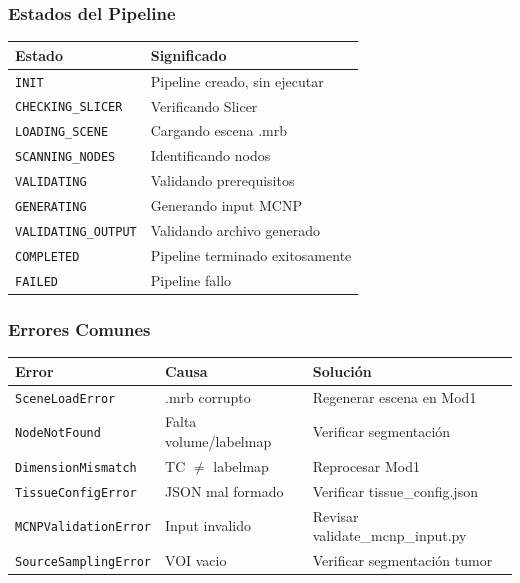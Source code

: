 \documentclass[12pt,a4paper]{article}
\begin{document}
\subsubsection{Estados del Pipeline}

\begin{center}
\begin{tabular}{ll}
\toprule
\textbf{Estado} & \textbf{Significado} \\
\midrule
\texttt{INIT} & Pipeline creado, sin ejecutar \\
\texttt{CHECKING\_SLICER} & Verificando Slicer \\
\texttt{LOADING\_SCENE} & Cargando escena .mrb \\
\texttt{SCANNING\_NODES} & Identificando nodos \\
\texttt{VALIDATING} & Validando prerequisitos \\
\texttt{GENERATING} & Generando input MCNP \\
\texttt{VALIDATING\_OUTPUT} & Validando archivo generado \\
\texttt{COMPLETED} & Pipeline terminado exitosamente \\
\texttt{FAILED} & Pipeline fallo \\
\bottomrule
\end{tabular}
\end{center}

\subsubsection{Errores Comunes}

\begin{center}
\begin{tabular}{lll}
\toprule
\textbf{Error} & \textbf{Causa} & \textbf{Solución} \\
\midrule
\texttt{SceneLoadError} & .mrb corrupto & Regenerar escena en Mod1 \\
\texttt{NodeNotFound} & Falta volume/labelmap & Verificar segmentación \\
\texttt{DimensionMismatch} & TC $\neq$ labelmap & Reprocesar Mod1 \\
\texttt{TissueConfigError} & JSON mal formado & Verificar tissue\_config.json \\
\texttt{MCNPValidationError} & Input invalido & Revisar validate\_mcnp\_input.py \\
\texttt{SourceSamplingError} & VOI vacio & Verificar segmentación tumor \\
\bottomrule
\end{tabular}
\end{center}
\end{document}
